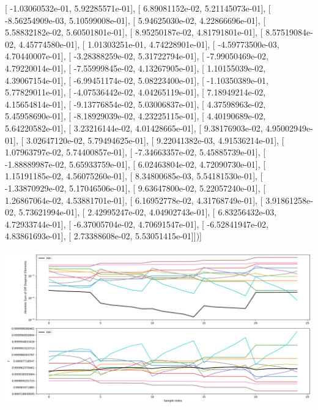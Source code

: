 \documentclass{article}
\begin{document}
       [ -1.03060532e-01,   5.92285571e-01],
       [  6.89081152e-02,   5.21145073e-01],
       [ -8.56254909e-03,   5.10599008e-01],
       [  5.94625030e-02,   4.22866696e-01],
       [  5.58832182e-02,   5.60501801e-01],
       [  8.95250187e-02,   4.81791801e-01],
       [  8.57519084e-02,   4.45774580e-01],
       [  1.01303251e-01,   4.74228901e-01],
       [ -4.59773500e-03,   4.70440007e-01],
       [ -3.28388259e-02,   5.31722794e-01],
       [ -7.99050469e-02,   4.79220014e-01],
       [ -7.55999845e-02,   4.13267905e-01],
       [  1.10155039e-02,   4.39067154e-01],
       [ -6.99451174e-02,   5.08223400e-01],
       [ -1.10350389e-01,   5.77829011e-01],
       [ -4.07536442e-02,   4.04265119e-01],
       [  7.18949214e-02,   4.15654814e-01],
       [ -9.13776854e-02,   5.03006837e-01],
       [  4.37598963e-02,   5.45958690e-01],
       [ -8.18929039e-02,   4.23225115e-01],
       [  4.40190689e-02,   5.64220582e-01],
       [  3.23216144e-02,   4.01428665e-01],
       [  9.38176903e-02,   4.95002949e-01],
       [  3.02647120e-02,   5.79494625e-01],
       [  9.22041382e-03,   4.91536214e-01],
       [  1.07963797e-02,   5.74400857e-01],
       [ -7.34663357e-02,   5.45885739e-01],
       [ -1.88889987e-02,   5.65933759e-01],
       [  6.02463804e-02,   4.72090730e-01],
       [  1.15191185e-02,   4.56075260e-01],
       [  8.34800685e-03,   5.54181530e-01],
       [ -1.33870929e-02,   5.17046506e-01],
       [  9.63647800e-02,   5.22057240e-01],
       [  1.26867064e-02,   4.53881701e-01],
       [  6.16952778e-02,   4.31768749e-01],
       [  3.91861258e-02,   5.73621994e-01],
       [  2.42995247e-02,   4.04902743e-01],
       [  6.83256432e-03,   4.72933744e-01],
       [ -6.37005704e-02,   4.70691547e-01],
       [ -6.52841947e-02,   4.83861693e-01],
       [  2.73388608e-02,   5.53051415e-01]])]
\begin{center}
\includegraphics[scale=.9]{report_pickled_controls221/control_dpn_all.png}

\end{center}
\end{document}
